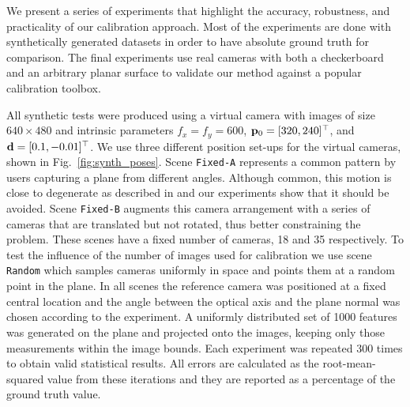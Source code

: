 \documentclass[10pt,twocolumn,letterpaper]{article}
\begin{document}
We present a series of experiments that highlight the accuracy, robustness, and practicality of our calibration approach. Most of the experiments are done with synthetically generated datasets in order to have absolute ground truth for comparison. The final experiments use real cameras with both a checkerboard and an arbitrary planar surface to validate our method against a popular calibration toolbox.

All synthetic tests were produced using a virtual camera with images of size $640 \times 480$ and intrinsic parameters $f_x=f_y=600$, $\mathbf{p}_0=[320,240]^\top$, and $\mathbf{d}=[0.1,-0.01]^\top$. We use three different position set-ups for the virtual cameras, shown in Fig.~\ref{fig:synth_poses}. Scene \texttt{Fixed-A} represents a common pattern by users capturing a plane from different angles. Although common, this motion is close to degenerate as described in \cite{sturm1997} and our experiments show that it should be avoided. Scene \texttt{Fixed-B} augments this camera arrangement with a series of cameras that are translated but not rotated, thus better constraining the problem. These scenes have a fixed number of cameras, 18 and 35 respectively. To test the influence of the number of images used for calibration we use scene \texttt{Random} which samples cameras uniformly in space and points them at a random point in the plane. In all scenes the reference camera was positioned at a fixed central location and the angle between the optical axis and the plane normal was chosen according to the experiment. A uniformly distributed set of 1000 features was generated on the plane and projected onto the images, keeping only those measurements within the image bounds. Each experiment was repeated 300 times to obtain valid statistical results. All errors are calculated as the root-mean-squared value from these iterations and they are reported as a percentage of the ground truth value.
\end{document}
